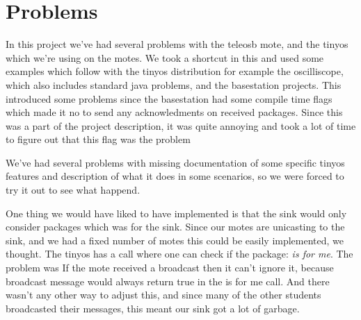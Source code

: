 \section{Problems}
In this project we've had several problems with the teleosb mote, and the tinyos which we're using on the motes. We took a shortcut in this and used some examples which follow with the tinyos distribution for example the oscilliscope, which also includes standard java problems,  and the basestation projects. This introduced some problems since the basestation had some compile time flags which made it no to send any acknowledments on received packages. Since this was a part of the project description, it was quite annoying and took a lot of time to figure out that this flag was the problem 

We've had several problems with missing documentation of some specific tinyos features and description of what it does in some scenarios, so we were forced to try it out to see what happend. 

One thing we would have liked to have implemented is that the sink would only consider packages which was for the sink. Since our motes are unicasting to the sink, and we had a fixed number of motes this could be easily implemented, we thought. The tinyos has a call where one can check if the package: \emph{is for me}. The problem was If the mote received a broadcast then it can't ignore it, because broadcast message would always return true in the is for me call. And there wasn't any other way to adjust this, and since many of the other students broadcasted their messages, this meant our sink got a lot of garbage.
